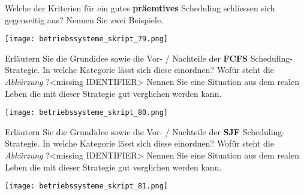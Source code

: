 \documentclass{article}
\begin{document}
\begin{tcolorbox}[colback=white!10!white,colframe=lightgray!75!black,
  savelowerto=\jobname_ex.tex]

\begin{center}
Welche der Kriterien für ein gutes 
\textbf{präemtives
} Scheduling schliessen sich gegenseitig aus? Nennen Sie zwei Beispiele.

\end{center}

\tcblower

\justifying
\texttt{[image: betriebssysteme\_skript\_79.png]}

\end{tcolorbox}
\begin{tcolorbox}[colback=white!10!white,colframe=lightgray!75!black,
  savelowerto=\jobname_ex.tex]

\begin{center}
Erläutern Sie die Grundidee sowie die Vor- / Nachteile der 
\textbf{FCFS
} Scheduling-Strategie. In welche Kategorie lässt sich diese einordnen? Wofür steht die 
\textit{Abkürzung
}?<missing IDENTIFIER>
Nennen Sie eine Situation aus dem realen Leben die mit dieser Strategie gut verglichen werden kann.

\end{center}

\tcblower

\justifying
\texttt{[image: betriebssysteme\_skript\_80.png]}

\end{tcolorbox}
\begin{tcolorbox}[colback=white!10!white,colframe=lightgray!75!black,
  savelowerto=\jobname_ex.tex]

\begin{center}
Erläutern Sie die Grundidee sowie die Vor- / Nachteile der 
\textbf{SJF
} Scheduling-Strategie. In welche Kategorie lässt sich diese einordnen? Wofür steht die 
\textit{Abkürzung
}?<missing IDENTIFIER>
Nennen Sie eine Situation aus dem realen Leben die mit dieser Strategie gut verglichen werden kann.

\end{center}

\tcblower

\justifying
\texttt{[image: betriebssysteme\_skript\_81.png]}

\end{tcolorbox}
\end{document}
